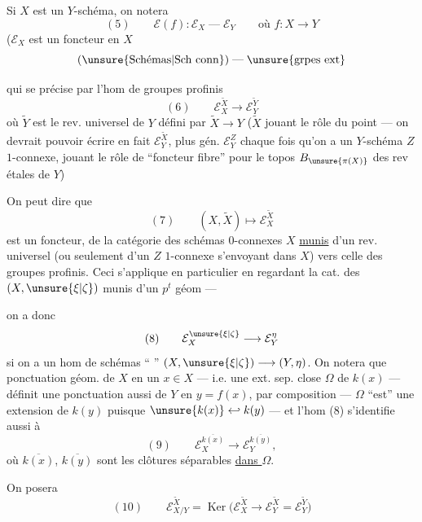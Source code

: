 Si $X$ est un $Y$-schéma,  on notera
\[
(5)\qquad \mathcal E(f):\mathcal E_X\mathrel{\text{---}}\mathcal E_Y\qquad\text{où }f:X\longrightarrow Y
\]
($\mathcal E_X$ est un foncteur en $X$
\[
(\unsure{\text{Schémas}|\text{Sch conn}})\mathrel{\text{---}}\unsure{\text{grpes ext}}
\]

qui se précise par l'hom  de groupes profinis
\[
(6)\qquad \mathcal E_X^{\widetilde X}\longrightarrow\mathcal E_Y^{\widetilde Y}
\]
où $\widetilde Y$ est le rev. universel de $Y$ défini par $\widetilde X\longrightarrow Y$ ($\widetilde X$ jouant le rôle du point --- on devrait pouvoir écrire en fait $\mathcal E_Y^{\widetilde X}$, plus gén. $\mathcal E_Y^Z$ chaque fois qu'on a un $Y$-schéma $Z$ $1$-connexe, jouant le rôle de ``foncteur fibre'' pour le topos $B_{\unsure{\pi(X)}}$ des rev étales de $Y$)


On peut dire que
\[
(7)\qquad (X,\widetilde X)\longmapsto\mathcal E_X^{\widetilde X}
\]
est un foncteur, de la catégorie des schémas $0$-connexes $X$ \uline{munis} d'un rev. universel (ou seulement d'un $Z$ $1$-connexe s'envoyant dans $X$) vers celle des groupes profinis. Ceci s'applique en particulier en regardant la cat. des $(X,\unsure{\xi|\zeta})$ munis d'un $p^t$ géom ---


on a donc
\[
(8)\qquad \mathcal E_X^{\unsure{\xi|\zeta}}\longrightarrow\mathcal E_Y^\eta
\]
si on a un hom de schémas `` '' $(X,\unsure{\xi|\zeta})\longrightarrow(Y,\eta)$. On notera que  ponctuation géom. de $X$ en un $x\in X$ --- i.e. une ext. sep. close $\Omega$ de $k(x)$ --- définit  une ponctuation  aussi de $Y$ en $y=f(x)$,  par composition --- $\Omega$ ``est'' une extension de $k(y)$ puisque $\unsure{k(x)}\hookleftarrow k(y)$ --- et l'hom (8) s'identifie aussi à
\[
(9)\qquad \mathcal E_X^{\overline{k(x)}}\longrightarrow\mathcal E_Y^{\overline{k(y)}},
\]
où $\overline{k(x)}$, $\overline{k(y)}$ sont les clôtures séparables \uline{dans $\Omega$}.

On posera
\[
(10)\qquad \mathcal E_{X/Y}^{\widetilde X}=\operatorname{Ker}\bigl(\mathcal E_X^{\widetilde X}\longrightarrow\mathcal E_Y^{\widetilde X}=\mathcal E_Y^{\widetilde Y}\bigr)
\]

